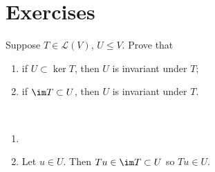\section*{Exercises}
\begin{exercise}
Suppose $T\in\mathcal{L}(V)$, $U\le V$. Prove that
\begin{enumerate}[label=(\roman*)]
\item if $U\subset \ker T$, then $U$ is invariant under $T$;
\item if $\im T\subset U$, then $U$ is invariant under $T$.
\end{enumerate}
\end{exercise}

\begin{solution} \
\begin{enumerate}[label=(\roman*)]
\item 
\item Let $u\in U$. Then $Tu\in\im T\subset U$ so $Tu\in U$.
\end{enumerate}
\end{solution}